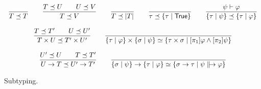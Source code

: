 \documentclass[%
  a4paper,
  UKenglish,
  cleveref,
  autoref,
  thm-restate,
  numberwithinsect,
]{lipics-v2021}
\newcommand\thesis{\vdash}
\newcommand\temp[1]{\mathsf{#1}}
\newcommand\True{\temp{True}}
\newcommand\term[1]{\mathsf{#1}}
\newcommand\inj{\mathop{\term{in}}}
\newcommand\arrow\to
\newcommand\subtype\preceq
\newcommand\eqtype\simeq
\newcommand\reft[1]{\left\{ #1 \right\}}
\newcommand\defrealto{\mathrel\parallel\joinrel\to}
\newcommand\realto{\mathrel{\defrealto}}
\newcommand\PT{\tau}		%
\newcommand\PTbis{\sigma}	%
\newcommand\RT{T}               %
\newcommand\RTbis{U}            %
\newcommand\RTter{V}            %
\newcommand\UPT[1]{\vert #1 \vert}        %
\newcommand\form[1]{\lbrack #1 \rbrack}
\begin{document}
\begin{figure}[t!]
\centering
\(
\begin{array}{c}
%
\dfrac{}
  {\RT \subtype \RT}
%
\qquad
%
\dfrac{\RT \subtype \RTbis
  \qquad
  \RTbis \subtype \RTter}
  {\RT \subtype \RTter}
%
\qquad
%
\dfrac{}
  {\RT \subtype \UPT\RT}
%
\qquad
%
\dfrac{}
  {\PT \subtype \reft{\PT \mid \True}}
%
\qquad
%
\dfrac{\psi \thesis \varphi}
  {\reft{\PT \mid \psi} \subtype \reft{\PT \mid \varphi}}
%
\\\\
%
\dfrac{\RT \subtype \RT'
  \qquad
  \RTbis \subtype \RTbis'}
  {\RT \times \RTbis \subtype \RT' \times \RTbis'}
%
\qquad
%
\dfrac{}{
  \reft{\PT \mid \varphi}
  \times
  \reft{\PTbis \mid \psi}
  \eqtype
  \reft{\PT \times \PTbis \mid \form{\pi_1}\varphi \land \form{\pi_2}\psi}}
%
\\\\
%
\dfrac{\RTbis' \subtype \RTbis
  \qquad
  \RT \subtype \RT'}
  {\RTbis \arrow \RT \subtype \RTbis' \arrow \RT'}
%
%
\qquad
%
\dfrac{}
  {\reft{\PTbis \mid \psi} \arrow \reft{\PT \mid \varphi}
  \eqtype
  \reft{\PTbis \arrow \PT \mid \psi \realto \varphi}}
%
% 
% 
% 
%
\end{array}
\)

\caption{Subtyping.%
\label{fig:reft:subtyping}}
\end{figure}
\end{document}

